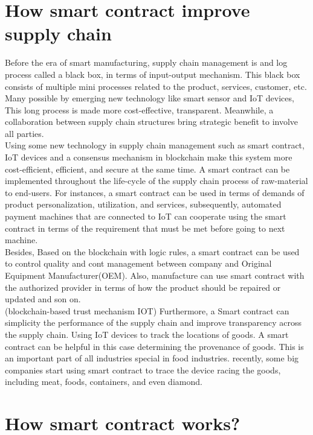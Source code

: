 \section{How smart contract improve supply chain}
Before the era of smart manufacturing, supply chain management is and log process called a black box, in terms of input-output mechanism. This black box consists of multiple mini processes related to the product, services, customer, etc. Many possible by emerging new technology like smart sensor and IoT devices, This long process is made more cost-effective, transparent. Meanwhile, a collaboration between supply chain structures bring strategic benefit to involve all parties.\\
Using some new technology in supply chain management such as smart contract, IoT devices and a consensus mechanism in blockchain make this system more cost-efficient, efficient, and secure at the same time. A smart contract can be implemented throughout the life-cycle of the supply chain process of raw-material to end-users. For instances, a smart contract can be used in terms of demands of product personalization, utilization, and services, subsequently, automated payment machines that are connected to IoT can cooperate using the smart contract in terms of the requirement that must be met before going to next machine.\\
Besides, Based on the blockchain with logic rules, a smart contract can be used to control quality and cont management between company and Original Equipment Manufacturer(OEM). Also, manufacture can use smart contract with the authorized provider in terms of how the product should be repaired or updated and son on.\\ (blockchain-based trust mechanism IOT)
Furthermore, a Smart contract can simplicity the performance of the supply chain and improve transparency across the supply chain. Using IoT devices to track the locations of goods. A smart contract can be helpful in this case determining the provenance of goods. This is an important part of all industries special in food industries. recently, some big companies start using smart contract to trace the device racing the goods, including meat, foods, containers, and even diamond\cite{Adam}.

\section{How smart contract works?}


